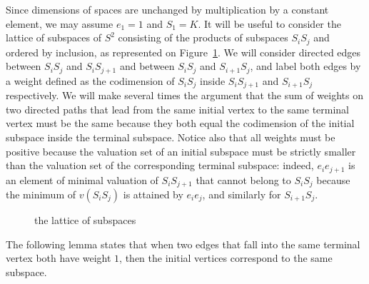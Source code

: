 \documentclass[10pt]{amsart}
\theoremstyle{definition}
\theoremstyle{remark}
\begin{document}
Since dimensions of spaces are unchanged by multiplication by a constant element, we may assume $e_1=1$ and $S_1=K$. It will be useful to consider the lattice of subspaces of $S^2$ consisting of the products of subspaces $S_iS_j$ and ordered by inclusion, as represented on Figure~\ref{fig:subspaces}. We will consider directed edges between $S_iS_j$ and $S_iS_{j+1}$ and between $S_iS_j$ and $S_{i+1}S_{j}$, and label both edges by a weight defined as the codimension of $S_iS_j$ inside $S_iS_{j+1}$ and $S_{i+1}S_{j}$ respectively. We will make several times the argument that the sum of weights on two directed paths that lead from the same initial vertex to the same terminal vertex must be the same because they both equal the codimension of the initial subspace inside the terminal subspace. Notice also that all weights must be positive because the valuation set of an initial subspace must be strictly smaller than the valuation set of the corresponding terminal subspace: indeed, $e_ie_{j+1}$ is an element of minimal valuation of $S_iS_{j+1}$ that cannot belong to $S_iS_j$ because the minimum of $v(S_iS_j)$ is attained by $e_ie_j$, and similarly for $S_{i+1}S_j$.

\begin{figure}[!h]
\centering
{}
\caption{the lattice of subspaces}\label{fig:subspaces}
\end{figure}

The following lemma states that when two edges that fall into the same terminal vertex both have weight $1$, then the initial vertices correspond to the same subspace.
\end{document}
